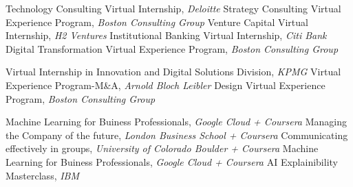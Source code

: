 \begin{scholarship}
					{Technology Consulting Virtual Internship, \textit{Deloitte}}
					{Strategy Consulting Virtual Experience Program, \textit{Boston Consulting Group}}
					{Venture Capital Virtual Internship, \textit{H2 Ventures}}
					{Institutional Banking Virtual Internship, \textit{Citi Bank}}
					{Digital Transformation Virtual Experience Program, \textit{Boston Consulting Group}}

					{Virtual Internship in Innovation and Digital Solutions Division, \textit{KPMG}}
					{Virtual Experience Program-M\&A, \textit{Arnold Bloch Leibler}}
					{Design Virtual Experience Program, \textit{Boston Consulting Group}}
	
\end{scholarship}

\begin{scholarship}
					{Machine Learning for Buiness Professionals, \textit{Google Cloud + Coursera}}
					{Managing the Company of the future, \textit{London Business School + Coursera}}
					{Communicating effectively in groups, \textit{University of Colorado Boulder + Coursera}}
					{Machine Learning for Buiness Professionals, \textit{Google Cloud + Coursera}}
					{AI Explainibility Masterclass, \textit{IBM}}
\end{scholarship}